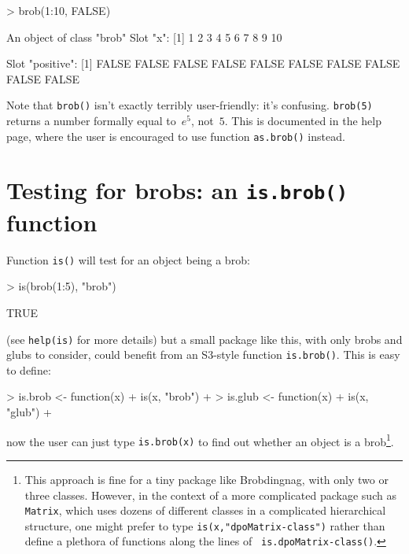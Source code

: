\documentclass[a4paper]{article}
\begin{document}
\begin{Schunk}
\begin{Sinput}
> brob(1:10, FALSE)
\end{Sinput}
\begin{Soutput}
An object of class "brob"
Slot "x":
 [1]  1  2  3  4  5  6  7  8  9 10

Slot "positive":
 [1] FALSE FALSE FALSE FALSE FALSE FALSE FALSE FALSE FALSE FALSE
\end{Soutput}
\end{Schunk}

Note that {\tt brob()} isn't exactly terribly user-friendly: it's
confusing. {\tt brob(5)} returns a number formally equal to~$e^5$,
not~$5$.   This is documented in the help page, where the user is
encouraged to use function {\tt as.brob()} instead.

\section{Testing for brobs: an {\tt is.brob()} function}

Function {\tt is()} will test for an object being a brob:

\begin{Schunk}
\begin{Sinput}
> is(brob(1:5), "brob")
\end{Sinput}
\begin{Soutput}
[1] TRUE
\end{Soutput}
\end{Schunk}

(see {\tt help(is)} for more details) but a small package like this,
with only brobs and glubs to consider, could benefit from an S3-style
function {\tt is.brob()}.  This is easy to define:

\begin{Schunk}
\begin{Sinput}
> is.brob <- function(x) {
+     is(x, "brob")
+ }
> is.glub <- function(x) {
+     is(x, "glub")
+ }
\end{Sinput}
\end{Schunk}

now the user can just type {\tt is.brob(x)} to find out whether an
object is a brob\footnote{This approach is fine for a tiny package
like Brobdingnag, with only two or three classes.  However, in the
context of a more complicated package such as {\tt Matrix}, which uses
dozens of different classes in a complicated hierarchical structure,
one might prefer to type {\tt is(x,"dpoMatrix-class")} rather than
define a plethora of functions along the lines of {\tt
is.dpoMatrix-class()}.}.
\end{document}
